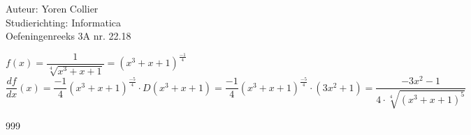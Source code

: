 \documentclass[a4paper]{article}
\newcommand{\Lh}{\left(} %
\newcommand{\Rh}{\right)}
\begin{document}
\noindent \large Auteur: Yoren Collier \\
\noindent \large Studierichting: Informatica\\
\noindent \large Oefeningenreeks 3A nr. 22.18\\

\medskip

\normalsize

$f(x) = \dfrac{1}{\sqrt[4]{x^3+x+1}} = \Lh x^3 +x +1 \Rh ^{\tfrac{-1}{4}}$\\

$\dfrac{df}{dx}(x) = \dfrac{-1}{4} \Lh x^3+x+1 \Rh ^{\tfrac{-5}{4}} \cdot D\Lh x^3 +x +1 \Rh = \dfrac{-1}{4} \Lh x^3+x+1 \Rh ^{\tfrac{-5}{4}} \cdot \Lh 3x^2 +1 \Rh = \dfrac{-3x^2 -1}{4 \cdot \sqrt[4]{\Lh x^3 +x+1 \Rh ^5}}$\\

\begin{thebibliography}{999}
\end{thebibliography}
\end{document}
